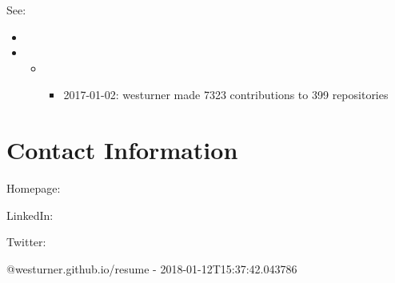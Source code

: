 \documentclass[letter,,openany,oneside,english]{sphinxhowto}
\begin{document}
See:
\begin{itemize}
\item {} 

\item {} 
\begin{itemize}
\item {} 
\begin{itemize}
\item {} 
2017-01-02: \sphinxquotedblleft{}westurner made 7323 contributions to 399 repositories\sphinxquotedblright{}

\end{itemize}

\end{itemize}

\end{itemize}


\section{Contact Information}
\label{\detokenize{resume:contact-information}}
\begin{DUlineblock}{0em}
\item[] Homepage: 
\item[] LinkedIn: 
\item[] Twitter: 
\end{DUlineblock}

@westurner.github.io/resume - 2018-01-12T15:37:42.043786

\renewcommand{\indexname}{Index}
\end{document}

